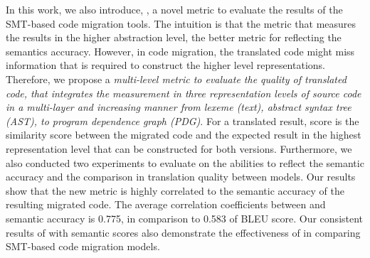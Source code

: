 

In this work, we also introduce, {\model}, a novel metric to evaluate
the results of the SMT-based code migration tools. The intuition is
that the metric that measures the results in the higher abstraction
level, the better metric for reflecting the semantics
accuracy. However, in code migration, the translated code might miss
information that is required to construct the higher level
representations. Therefore, we propose a {\em multi-level metric to
evaluate the quality of translated code, that integrates the
measurement in three representation levels of source code in a
multi-layer and increasing manner from lexeme (text), abstract syntax
tree (AST), to program dependence graph (PDG)}. For a translated
result, {\model} score is the similarity score between the migrated code
and the expected result in the highest representation level that can
be constructed for both versions. Furthermore,
we also conducted two experiments to evaluate {\model} on the abilities to
reflect the semantic accuracy and the comparison in translation quality
between models. Our results show that the new metric {\model} is
highly correlated to the semantic accuracy of the resulting migrated
code. The average correlation coefficients between {\model} and
semantic accuracy is 0.775, in comparison to 0.583 of BLEU score.  Our
consistent results of {\model} with semantic scores also demonstrate
the effectiveness of {\model} in comparing SMT-based code migration
models.

